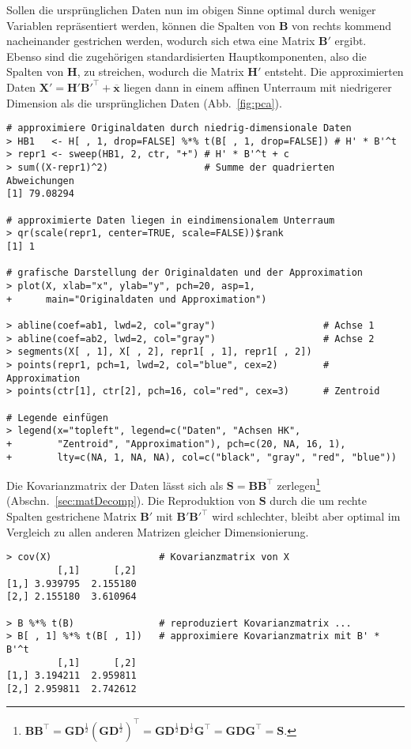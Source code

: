 Sollen die ursprünglichen Daten nun im obigen Sinne optimal durch weniger Variablen repräsentiert werden, können die Spalten von $\bm{B}$ von rechts kommend nacheinander gestrichen werden, wodurch sich etwa eine Matrix $\bm{B}'$ ergibt. Ebenso sind die zugehörigen standardisierten Hauptkomponenten, also die Spalten von $\bm{H}$, zu streichen, wodurch die Matrix $\bm{H}'$ entsteht. Die approximierten Daten $\bm{X}' = \bm{H}' \bm{B}'^{\top} + \overline{\bm{x}}$ liegen dann in einem affinen Unterraum mit niedrigerer Dimension als die ursprünglichen Daten (Abb.\ \ref{fig:pca}). %
\begin{lstlisting}
# approximiere Originaldaten durch niedrig-dimensionale Daten
> HB1   <- H[ , 1, drop=FALSE] %*% t(B[ , 1, drop=FALSE]) # H' * B'^t
> repr1 <- sweep(HB1, 2, ctr, "+") # H' * B'^t + c
> sum((X-repr1)^2)                 # Summe der quadrierten Abweichungen
[1] 79.08294

# approximierte Daten liegen in eindimensionalem Unterraum
> qr(scale(repr1, center=TRUE, scale=FALSE))$rank
[1] 1

# grafische Darstellung der Originaldaten und der Approximation
> plot(X, xlab="x", ylab="y", pch=20, asp=1,
+      main="Originaldaten und Approximation")

> abline(coef=ab1, lwd=2, col="gray")                   # Achse 1
> abline(coef=ab2, lwd=2, col="gray")                   # Achse 2
> segments(X[ , 1], X[ , 2], repr1[ , 1], repr1[ , 2])
> points(repr1, pch=1, lwd=2, col="blue", cex=2)        # Approximation
> points(ctr[1], ctr[2], pch=16, col="red", cex=3)      # Zentroid

# Legende einfügen
> legend(x="topleft", legend=c("Daten", "Achsen HK",
+        "Zentroid", "Approximation"), pch=c(20, NA, 16, 1),
+        lty=c(NA, 1, NA, NA), col=c("black", "gray", "red", "blue"))
\end{lstlisting}

Die Kovarianzmatrix der Daten lässt sich als $\bm{S} = \bm{B} \bm{B}^{\top}$ zerlegen\footnote{$\bm{B} \bm{B}^{\top} = \bm{G} \bm{D}^{\frac{1}{2}} (\bm{G} \bm{D}^{\frac{1}{2}})^{\top} = \bm{G} \bm{D}^{\frac{1}{2}} \bm{D}^{\frac{1}{2}} \bm{G}^{\top} = \bm{G} \bm{D} \bm{G}^{\top} = \bm{S}$.} (Abschn.\ \ref{sec:matDecomp}). Die Reproduktion von $\bm{S}$ durch die um rechte Spalten gestrichene Matrix $\bm{B}'$ mit $\bm{B}' \bm{B}'^{\top}$ wird schlechter, bleibt aber optimal im Vergleich zu allen anderen Matrizen gleicher Dimensionierung.
\begin{lstlisting}
> cov(X)                   # Kovarianzmatrix von X
         [,1]      [,2]
[1,] 3.939795  2.155180
[2,] 2.155180  3.610964

> B %*% t(B)               # reproduziert Kovarianzmatrix ...
> B[ , 1] %*% t(B[ , 1])   # approximiere Kovarianzmatrix mit B' * B'^t
         [,1]      [,2]
[1,] 3.194211  2.959811
[2,] 2.959811  2.742612
\end{lstlisting}

